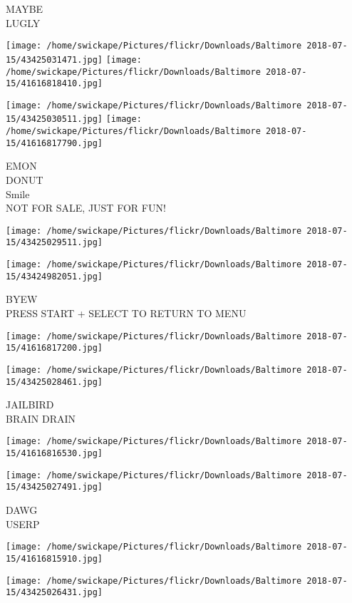 \documentclass[10pt,letterpaper]{article}
\begin{document}
MAYBE\\
LUGLY
\pagebreak

\texttt{[image: /home/swickape/Pictures/flickr/Downloads/Baltimore 2018-07-15/43425031471.jpg]}
\texttt{[image: /home/swickape/Pictures/flickr/Downloads/Baltimore 2018-07-15/41616818410.jpg]}

\texttt{[image: /home/swickape/Pictures/flickr/Downloads/Baltimore 2018-07-15/43425030511.jpg]}
\texttt{[image: /home/swickape/Pictures/flickr/Downloads/Baltimore 2018-07-15/41616817790.jpg]}

EMON\\
DONUT\\
Smile\\
NOT FOR SALE, JUST FOR FUN!
\pagebreak

\texttt{[image: /home/swickape/Pictures/flickr/Downloads/Baltimore 2018-07-15/43425029511.jpg]}

\vspace{0.25in}
\texttt{[image: /home/swickape/Pictures/flickr/Downloads/Baltimore 2018-07-15/43424982051.jpg]}

BYEW\\
PRESS START + SELECT TO RETURN TO MENU
\pagebreak

\texttt{[image: /home/swickape/Pictures/flickr/Downloads/Baltimore 2018-07-15/41616817200.jpg]}

\vspace{0.25in}
\texttt{[image: /home/swickape/Pictures/flickr/Downloads/Baltimore 2018-07-15/43425028461.jpg]}

JAILBIRD\\
BRAIN DRAIN
\pagebreak

\texttt{[image: /home/swickape/Pictures/flickr/Downloads/Baltimore 2018-07-15/41616816530.jpg]}

\vspace{0.25in}
\texttt{[image: /home/swickape/Pictures/flickr/Downloads/Baltimore 2018-07-15/43425027491.jpg]}

DAWG\\
USERP
\pagebreak

\texttt{[image: /home/swickape/Pictures/flickr/Downloads/Baltimore 2018-07-15/41616815910.jpg]}

\vspace{0.25in}
\texttt{[image: /home/swickape/Pictures/flickr/Downloads/Baltimore 2018-07-15/43425026431.jpg]}
\end{document}
